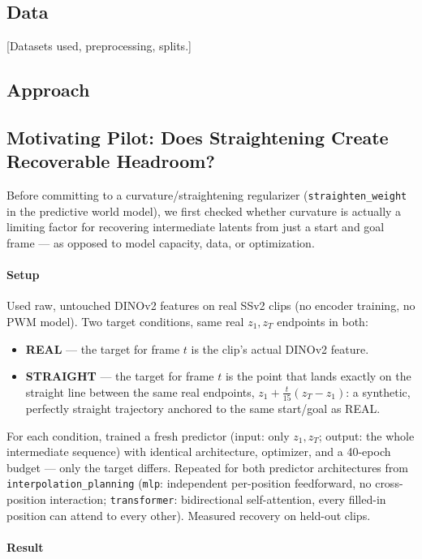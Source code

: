 \subsection{Data}
[Datasets used, preprocessing, splits.]

\subsection{Approach}

\subsection{Motivating Pilot: Does Straightening Create Recoverable Headroom?}
\label{sec:methodology-straightening-poc}

Before committing to a curvature/straightening regularizer (\texttt{straighten\_weight}
in the predictive world model), we first checked whether curvature is actually a
limiting factor for recovering intermediate latents from just a start and goal frame ---
as opposed to model capacity, data, or optimization.

\paragraph{Setup} Used raw, untouched DINOv2 features on real SSv2 clips (no encoder
training, no PWM model). Two target conditions, same real $z_1, z_T$ endpoints in both:
\begin{itemize}
    \item \textbf{REAL} --- the target for frame $t$ is the clip's actual DINOv2 feature.
    \item \textbf{STRAIGHT} --- the target for frame $t$ is the point that lands exactly
    on the straight line between the same real endpoints,
    $z_1 + \tfrac{t}{15}(z_T - z_1)$: a synthetic, perfectly straight trajectory anchored
    to the same start/goal as REAL.
\end{itemize}
For each condition, trained a fresh predictor (input: only $z_1, z_T$; output: the whole
intermediate sequence) with identical architecture, optimizer, and a 40-epoch budget ---
only the target differs. Repeated for both predictor architectures from
\texttt{interpolation\_planning} (\texttt{mlp}: independent per-position feedforward,
no cross-position interaction; \texttt{transformer}: bidirectional self-attention, every
filled-in position can attend to every other). Measured recovery on held-out clips.

\paragraph{Result}

